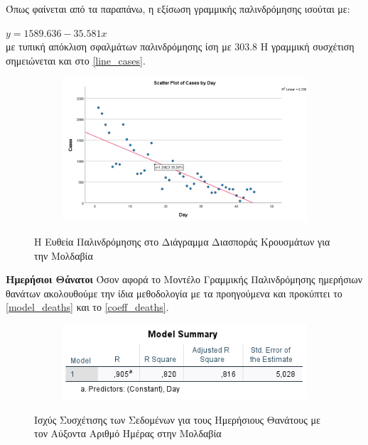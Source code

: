 \documentclass{article}
\begin{document}
    Όπως φαίνεται από τα παραπάνω, η εξίσωση γραμμικής παλινδρόμησης ισούται με:
    
    $ y = 1589.636 - 35.581x $ \\
    με τυπική  απόκλιση  σφαλμάτων  παλινδρόμησης ίση με 303.8
    Η γραμμική συσχέτιση σημειώνεται και στο \autoref{line_cases}.
    
    \begin{figure}[H]
    \centering
    \begin{adjustbox}{center}
    	\begin{subfigure}[c]{1\textwidth}    
    		\includegraphics[width=1\textwidth,height=\textheight,keepaspectratio]{media/2/line_cases.png}
    	\end{subfigure}%
    \end{adjustbox}
    \caption{Η Ευθεία Παλινδρόμησης στο Διάγραμμα Διασποράς Κρουσμάτων για την Μολδαβία}
    \label{line_cases}
    \end{figure}
    
    \noindent
    {\large \textbf{Ημερήσιοι Θάνατοι}}
    \newline
     Όσον αφορά το Μοντέλο Γραμμικής Παλινδρόμησης ημερήσιων θανάτων ακολουθούμε την ίδια μεθοδολογία με τα προηγούμενα και προκύπτει το \autoref{model_deaths} και το  \autoref{coeff_deaths}.
     
     \begin{figure}[H]
    \centering
    \begin{adjustbox}{center}
    	\begin{subfigure}[c]{1\textwidth}    
    		\includegraphics[width=1\textwidth,height=\textheight,keepaspectratio]{media/2/model_sum_deaths.png}
    	\end{subfigure}%
    \end{adjustbox}
    \caption{Ισχύς Συσχέτισης των Σεδομένων για τους Ημερήσιους Θανάτους με τον Αύξοντα Αριθμό Ημέρας στην Μολδαβία}
    \label{model_deaths}
    \end{figure}
    
\end{document}
